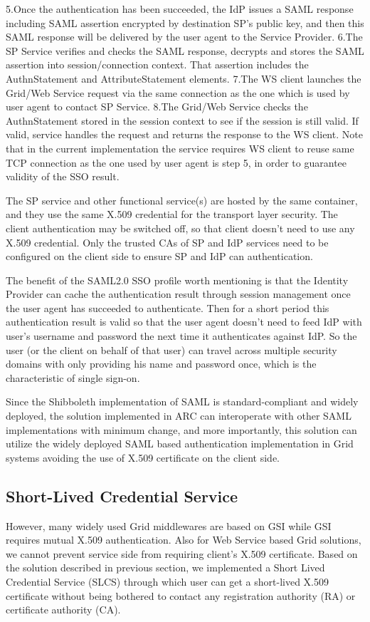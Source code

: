\documentclass[twocolumn]{svjour3}         %
\begin{document}
5.Once the authentication has been succeeded, the IdP issues a SAML response including SAML assertion encrypted by destination SP’s public key, and then this SAML response will be delivered by the user agent to the Service Provider.
6.The SP Service verifies and checks the SAML response, decrypts and stores the SAML assertion into session/connection context. That assertion includes the AuthnStatement and AttributeStatement elements.
7.The WS client launches the Grid/Web Service request via the same connection as the one which is used by user agent to contact SP Service.
8.The Grid/Web Service checks the AuthnStatement stored in the session context to see if the session is still valid. If valid, service handles the  request and returns the response to the WS client. Note that in the current implementation the service requires WS client to reuse same TCP connection as the one used by user agent is step 5, in order to guarantee  validity of the SSO result.

The SP service and other functional service(s) are hosted by the same container, and they use the same X.509 credential for the transport layer security. The client authentication may be switched off, so that client doesn’t need to use any X.509 credential. Only the trusted CAs of SP and IdP services need to be configured on the client side to ensure SP and IdP can authentication.

The benefit of the SAML2.0 SSO profile worth mentioning is that the Identity Provider can cache the authentication result through session management once the user agent has succeeded to authenticate. Then for a short period this authentication result is valid so that the user agent doesn’t need to feed IdP with user’s username and password the next time it authenticates against IdP. So the user (or the client on behalf of that user) can travel across multiple security domains with only providing his name and password once, which is the characteristic of single sign-on.

Since the Shibboleth implementation of SAML is standard-compliant and widely deployed, the solution implemented in ARC can interoperate with other SAML implementations with minimum change, and more importantly, this solution can utilize the widely deployed SAML based authentication implementation in Grid systems avoiding the use of X.509 certificate on the client side.


\subsection{Short-Lived Credential Service}
\label{sec:slcs}
However, many widely used Grid middlewares are based on GSI while GSI requires mutual X.509 authentication. Also for Web Service based Grid solutions, we cannot prevent service side from requiring client's X.509 certificate.  Based on the solution described in previous section, we implemented a Short Lived Credential Service (SLCS) through which user can get a short-lived X.509 certificate without being bothered to contact any registration authority (RA) or certificate authority (CA).
\end{document}
